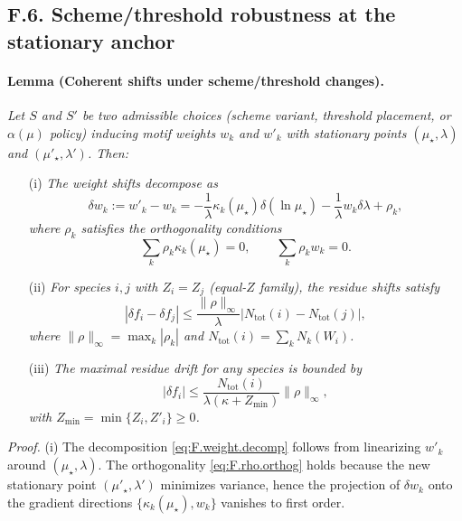 \documentclass[epjc3]{svjour3}
\begin{document}
\subsection*{F.6. Scheme/threshold robustness at the stationary anchor}

\paragraph{Lemma (Coherent shifts under scheme/threshold changes).}
\emph{Let $S$ and $S'$ be two admissible choices (scheme variant, threshold placement, or $\alpha(\mu)$ policy) inducing motif weights $w_k$ and $w'_k$ with stationary points $(\mu_\star,\lambda)$ and $(\mu'_\star,\lambda')$. Then:}
\begin{enumerate}
\item[(i)] \emph{The weight shifts decompose as}
\begin{equation}
  \delta w_k := w'_k - w_k = -\frac{1}{\lambda}\kappa_k(\mu_\star)\delta(\ln\mu_\star) - \frac{1}{\lambda}w_k\delta\lambda + \rho_k,
  \label{eq:F.weight.decomp}
\end{equation}
\emph{where $\rho_k$ satisfies the orthogonality conditions}
\begin{equation}
  \sum_k \rho_k \kappa_k(\mu_\star) = 0, \qquad \sum_k \rho_k w_k = 0.
  \label{eq:F.rho.orthog}
\end{equation}

\item[(ii)] \emph{For species $i,j$ with $Z_i = Z_j$ (equal-$Z$ family), the residue shifts satisfy}
\begin{equation}
  |\delta f_i - \delta f_j| \le \frac{\|\rho\|_\infty}{\lambda} |N_{\mathrm{tot}}(i) - N_{\mathrm{tot}}(j)|,
  \label{eq:F.coherence.bound}
\end{equation}
\emph{where $\|\rho\|_\infty = \max_k |\rho_k|$ and $N_{\mathrm{tot}}(i) = \sum_k N_k(W_i)$.}

\item[(iii)] \emph{The maximal residue drift for any species is bounded by}
\begin{equation}
  |\delta f_i| \le \frac{N_{\mathrm{tot}}(i)}{\lambda(\kappa + Z_{\min})} \|\rho\|_\infty,
  \label{eq:F.drift.bound}
\end{equation}
\emph{with $Z_{\min} = \min\{Z_i, Z'_i\} \ge 0$.}
\end{enumerate}

\emph{Proof.} (i) The decomposition \eqref{eq:F.weight.decomp} follows from linearizing $w'_k$ around $(\mu_\star,\lambda)$. The orthogonality \eqref{eq:F.rho.orthog} holds because the new stationary point $(\mu'_\star,\lambda')$ minimizes variance, hence the projection of $\delta w_k$ onto the gradient directions $\{\kappa_k(\mu_\star), w_k\}$ vanishes to first order.
\end{document}
